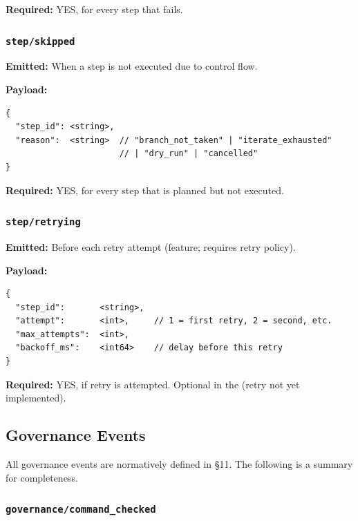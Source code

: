 \textbf{Required:} YES, for every step that fails.


\subsubsection{\texttt{step/skipped}}

\textbf{Emitted:} When a step is not executed due to control flow.

\textbf{Payload:}
\begin{verbatim}
{
  "step_id": <string>,
  "reason":  <string>  // "branch_not_taken" | "iterate_exhausted"
                       // | "dry_run" | "cancelled"
}
\end{verbatim}

\textbf{Required:} YES, for every step that is planned but not executed.


\subsubsection{\texttt{step/retrying}}

\textbf{Emitted:} Before each retry attempt (feature; requires retry policy).

\textbf{Payload:}
\begin{verbatim}
{
  "step_id":       <string>,
  "attempt":       <int>,     // 1 = first retry, 2 = second, etc.
  "max_attempts":  <int>,
  "backoff_ms":    <int64>    // delay before this retry
}
\end{verbatim}

\textbf{Required:} YES, if retry is attempted. Optional in the (retry not yet implemented).


\subsection{Governance Events}

All governance events are normatively defined in §11. The following is a summary for completeness.

\subsubsection{\texttt{governance/command\_checked}}

